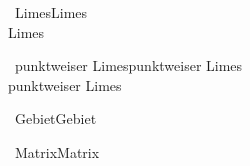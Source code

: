  \label{cap:math_basis}
	 \label{sec:lagr_gl}
		\begin{proposition}{\currentboxsection \ Limes}{Limes} \label{Limes}  \\
			Limes
		\end{proposition}
		
		\begin{lemma}{\currentboxsection \ punktweiser Limes}{punktweiser Limes} \label{punktweiser_Limes}  \\
			punktweiser Limes
		\end{lemma}

		
	 \label{sec:topologie}
		\begin{proposition}{\currentboxsection \ Gebiet}{Gebiet} \label{gebiet}  \\
			
		\end{proposition}

		
	 \label{secc:matrizen}
		\begin{proposition}{\currentboxsection \ Matrix}{Matrix} \label{matrix}  \\
			
		\end{proposition}
	
